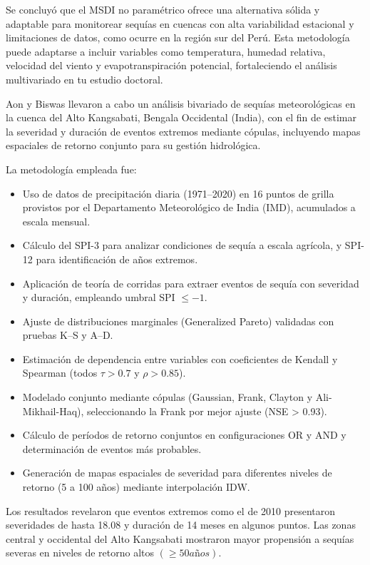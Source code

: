 Se concluyó que el MSDI no paramétrico ofrece una alternativa sólida y adaptable para monitorear sequías en cuencas con alta variabilidad estacional y limitaciones de datos, como ocurre en la región sur del Perú. Esta metodología puede adaptarse a incluir variables como temperatura, humedad relativa, velocidad del viento y evapotranspiración potencial, fortaleciendo el análisis multivariado en tu estudio doctoral.


Aon y Biswas \textcite{Aon2024} llevaron a cabo un análisis bivariado de sequías meteorológicas en la cuenca del Alto Kangsabati, Bengala Occidental (India), con el fin de estimar la severidad y duración de eventos extremos mediante cópulas, incluyendo mapas espaciales de retorno conjunto para su gestión hidrológica.

La metodología empleada fue:
\begin{itemize}
    \item Uso de datos de precipitación diaria (1971–2020) en 16 puntos de grilla provistos por el Departamento Meteorológico de India (IMD), acumulados a escala mensual.
    \item Cálculo del SPI-3 para analizar condiciones de sequía a escala agrícola, y SPI-12 para identificación de años extremos.
    \item Aplicación de teoría de corridas para extraer eventos de sequía con severidad y duración, empleando umbral SPI $\leq -1$.
    \item Ajuste de distribuciones marginales (Generalized Pareto) validadas con pruebas K–S y A–D.
    \item Estimación de dependencia entre variables con coeficientes de Kendall y Spearman (todos $\tau > 0.7$ y $\rho > 0.85$).
    \item Modelado conjunto mediante cópulas (Gaussian, Frank, Clayton y Ali-Mikhail-Haq), seleccionando la Frank por mejor ajuste (NSE > 0.93).
    \item Cálculo de períodos de retorno conjuntos en configuraciones OR y AND y determinación de eventos más probables.
    \item Generación de mapas espaciales de severidad para diferentes niveles de retorno (5 a 100 años) mediante interpolación IDW.
\end{itemize}

Los resultados revelaron que eventos extremos como el de 2010 presentaron severidades de hasta 18.08 y duración de 14 meses en algunos puntos. Las zonas central y occidental del Alto Kangsabati mostraron mayor propensión a sequías severas en niveles de retorno altos $(\geqslant 50 años)$.

